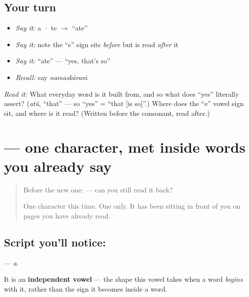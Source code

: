 \subsection*{Your turn}
\begin{itemize}
\raggedright
  \item \emph{Say it:} a · te $\to$ \textquotedblleft{}ate\textquotedblright{}
  \item \emph{Say it:} note the \textquotedblleft{}e\textquotedblright{} sign sits \emph{before}  but is read \emph{after} it
  \item \emph{Say it:} \textquotedblleft{}ate\textquotedblright{} — \textquotedblleft{}yes, that's so\textquotedblright{}
  \item \emph{Recall:} say \emph{namaskāraṁ}
\end{itemize}

\begin{tcolorbox}[breakable,colback=teal!4,colframe=teal!35!black,title={Before you move on}]
\emph{Read it:} \textbf{} What everyday word is it built from, and so what does \textquotedblleft{}yes\textquotedblright{} literally assert? (\emph{atŭ}, \textquotedblleft{}that\textquotedblright{} — so \textquotedblleft{}yes\textquotedblright{} = \textquotedblleft{}that {[}is so{]}\textquotedblright{}.) Where does the \textquotedblleft{}e\textquotedblright{} vowel sign sit, and where is it read? (Written before the consonant, read after.)
\end{tcolorbox}
\section[\texorpdfstring{\ml{അ} (a)}{അ (a)}]{ — one character, met inside words you already say}

\label{lesson:ML-S133-letter-a}



\begin{quote}
Before the new one:  — can you still read it back?

One character this time. One only. It has been sitting in front of you on pages you have already read.
\end{quote}

\subsection*{Script you'll notice: }
\textbf{} — \emph{a}.

It is an \textbf{independent vowel} — the shape this vowel takes when a word \emph{begins} with it, rather than the sign it becomes inside a word.

